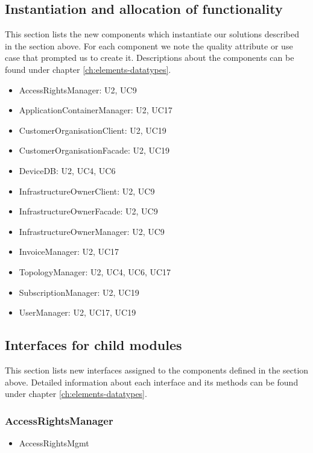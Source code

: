 \subsection{Instantiation and allocation of functionality}
    This section lists the new components which instantiate our solutions
    described in the section above. For each component we note the quality
    attribute or use case that prompted us to create it. Descriptions about
    the components can be found under chapter \ref{ch:elements-datatypes}. \\

    \begin{itemize}
        \item AccessRightsManager: U2, UC9
        \item ApplicationContainerManager: U2, UC17
        \item CustomerOrganisationClient: U2, UC19
        \item CustomerOrganisationFacade: U2, UC19
        \item DeviceDB: U2, UC4, UC6
        \item InfrastructureOwnerClient: U2, UC9
        \item InfrastructureOwnerFacade: U2, UC9
        \item InfrastructureOwnerManager: U2, UC9
        \item InvoiceManager: U2, UC17
        \item TopologyManager: U2, UC4, UC6, UC17
        \item SubscriptionManager: U2, UC19
        \item UserManager: U2, UC17, UC19
    \end{itemize}


\subsection{Interfaces for child modules}
    This section lists new interfaces assigned to the components defined
    in the section above. Detailed information about each interface and
    its methods can be found under chapter \ref{ch:elements-datatypes}.

    \subsubsection{AccessRightsManager}
        \begin{itemize}
            \item AccessRightsMgmt
        \end{itemize}

